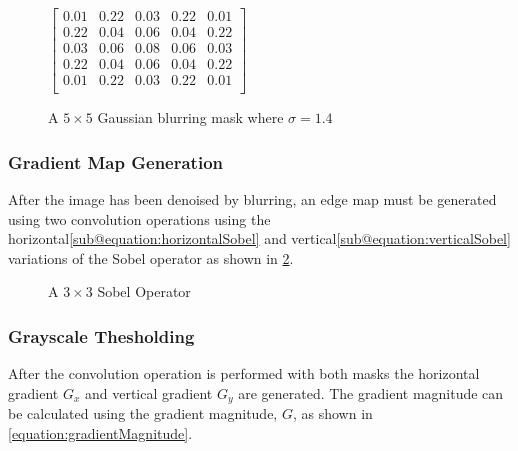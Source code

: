 \documentclass[12pt]{article}
\begin{document}
\begin{figure} %
  \centering
  $\begin{bmatrix}
  0.01 & 0.22 & 0.03 & 0.22 & 0.01 \\
  0.22 & 0.04 & 0.06 & 0.04 & 0.22 \\
  0.03 & 0.06 & 0.08 & 0.06 & 0.03 \\
  0.22 & 0.04 & 0.06 & 0.04 & 0.22 \\
  0.01 & 0.22 & 0.03 & 0.22 & 0.01 \\
\end{bmatrix}$\caption{A $5 \times 5$ Gaussian blurring mask where $\sigma = 1.4$}\label{equation:gaussian5by5}
\end{figure}


\subsubsection{Gradient Map Generation}
After the image has been denoised by blurring, an edge map must be generated using two convolution operations using the horizontal\ref*{sub@equation:horizontalSobel} and  vertical\ref{sub@equation:verticalSobel} variations of the Sobel operator as shown in \ref{figure:sobelOperator}.
\begin{figure}[h] %
  \centering
  \hfil
  \caption{A $3 \times 3$ Sobel Operator}\label{figure:sobelOperator}
\end{figure}

\subsubsection{Grayscale Thesholding}
After the convolution operation is performed with both masks the horizontal gradient $G_x$ and vertical gradient $G_y$ are generated. 
The gradient magnitude can be calculated using the gradient magnitude, $G$, as shown in \ref{equation:gradientMagnitude}.
\end{document}
